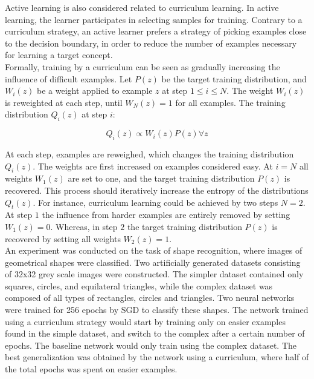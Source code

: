 Active learning \citep{Cohn_active_learning} is also considered related to curriculum learning. In active learning, the learner participates in selecting samples for training. Contrary to a curriculum strategy, an active learner prefers a strategy of picking examples close to the decision boundary, in order to reduce the number of examples necessary for learning a target concept.\\

Formally, training by a curriculum can be seen as gradually increasing the influence of difficult examples. Let $P(z)$ be the target training distribution, and $W_{i}(z)$ be a weight applied to example $z$ at step $1\leq i\leq N$. The weight $W_{i}(z)$ is reweighted at each step, until $W_{N}(z) = 1$ for all examples.  The training distribution  $Q_{i}(z)$ at step $i$:

$$Q_{i}(z)\propto W_{i}(z)P(z)\forall z$$

At each step, examples are reweighed, which changes the training distribution $Q_{i}(z)$. The weights are first increased on examples considered easy.  
At $i=N$ all weights $W_{1}(z)$ are set to one, and the target training distribution $P(z)$ is recovered. This process should iteratively increase the entropy of the distributions $Q_{t}(z)$. For instance, curriculum learning could be achieved by two steps $N=2$. At step $1$ the influence from harder examples are entirely removed by setting $W_{1}(z) = 0$. Whereas, in step $2$ the target training distribution $P(z)$ is recovered by setting all weights $W_{2}(z) = 1$.\\


An experiment was conducted on the task of shape recognition, where images of geometrical shapes were classified. Two artificially generated datasets consisting of 32x32 grey scale images were constructed. The simpler dataset contained only squares, circles, and equilateral triangles, while the complex dataset was composed of all types of rectangles, circles and triangles. Two neural networks were trained for 256 epochs by \ac{SGD} to classify these shapes. The network trained using a curriculum strategy would start by training only on easier examples found in the simple dataset, and switch to the complex after a certain number of epochs. The baseline network would only train using the complex dataset. The best generalization was obtained by the network using a curriculum, where half of the total epochs was spent on easier examples. \\

